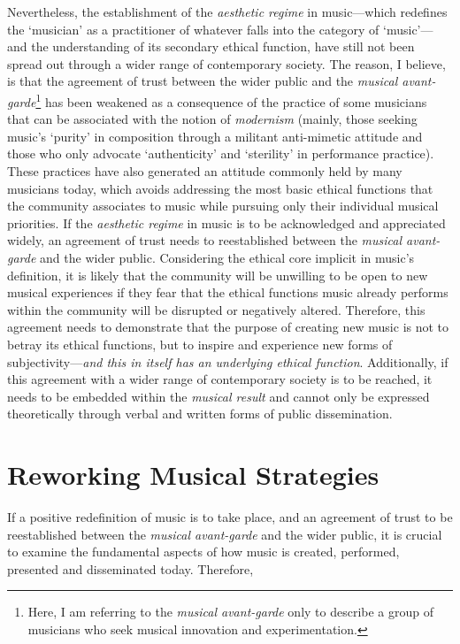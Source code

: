 Nevertheless, the establishment of the \emph{aesthetic regime} in music---which redefines the `musician' as a practitioner of whatever falls into the category of `music'---and the understanding of its secondary ethical function, have still not been spread out through a wider range of contemporary society. The reason, I believe, is that the agreement of trust between the wider public and the \emph{musical avant-garde}\footnote{Here, I am referring to the \emph{musical avant-garde} only to describe a group of musicians who seek musical innovation and experimentation.} has been weakened as a consequence of the practice of some musicians that can be associated with the notion of \emph{modernism} (mainly, those seeking music's `purity'  in composition through a militant anti-mimetic attitude and those who only advocate `authenticity' and `sterility' in performance practice). These practices have also generated an attitude commonly held by many musicians today, which avoids addressing the most basic ethical functions that the community associates to music while pursuing only their individual musical priorities. If the \emph{aesthetic regime} in music is to be acknowledged and appreciated widely, an agreement of trust needs to reestablished between the \emph{musical avant-garde} and the wider public. Considering the ethical core implicit in music's definition, it is likely that the community will be unwilling to be open to new musical experiences if they fear that the ethical functions music already performs within the community will be disrupted or negatively altered. Therefore, this agreement needs to demonstrate that the purpose of creating new music is not to betray its ethical functions, but to inspire and experience new forms of subjectivity---\emph{and this in itself has an underlying ethical function}. Additionally, if this agreement with a wider range of contemporary society is to be reached, it needs to be embedded within the \emph{musical result} and cannot only be expressed theoretically through verbal and written forms of public dissemination.

\section{Reworking Musical Strategies}

If a positive redefinition of music is to take place, and an agreement of trust to be reestablished between the \emph{musical avant-garde} and the wider public, it is crucial to examine the fundamental aspects of how music is created, performed, presented and disseminated today. Therefore, 

